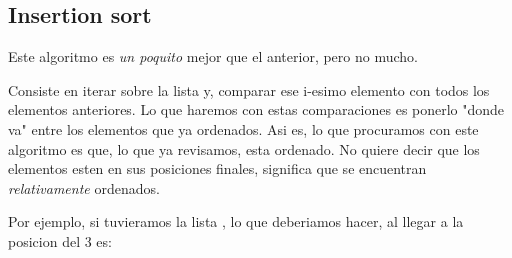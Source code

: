 \documentclass{article}
\begin{document}
\subsection{Insertion sort}

Este algoritmo es \textit{un poquito} mejor que el anterior, pero no mucho.

Consiste en iterar sobre la lista y, comparar ese i-esimo elemento con todos los elementos anteriores. Lo que haremos con estas comparaciones es ponerlo "donde va" entre los elementos que ya ordenados. Asi es, lo que procuramos con este algoritmo es que, lo que ya revisamos, esta ordenado. No quiere decir que los elementos esten en sus posiciones finales, significa que se encuentran \textit{relativamente} ordenados.

Por ejemplo, si tuvieramos la lista \formula{[1,2,4,5,3]}, lo que deberiamos hacer, al llegar a la posicion del 3 es:
\end{document}
